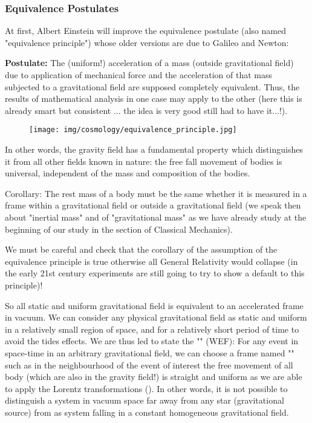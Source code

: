 	\subsubsection{Equivalence Postulates}
	At first, Albert Einstein will improve the equivalence postulate (also named "equivalence principle") whose older versions are due to Galileo and Newton:
	
	\textbf{Postulate:} The (uniform!) acceleration of a mass (outside gravitational field) due to application of mechanical force and the acceleration of that mass subjected to a gravitational field are supposed completely equivalent. Thus, the results of mathematical analysis in one case may apply to the other (here this is already smart but consistent ... the idea is very good still had to have it...!). 
	\begin{figure}[H]
		\centering
		\texttt{[image: img/cosmology/equivalence\_principle.jpg]}	
	\end{figure}
	In other words, the gravity field has a fundamental property which distinguishes it from all other fields known in nature: the free fall movement of bodies is universal, independent of the mass and composition of the bodies.
	
	Corollary: The rest mass of a body must be the same whether it is measured in a frame within a gravitational field or outside a gravitational field (we speak then about "inertial mass" and of "gravitational mass" as we have already study at the beginning of our study in the section of Classical Mechanics).
	
	\begin{tcolorbox}[title=Remark,colframe=black,arc=10pt]
	We must be careful and check that the corollary of the assumption of the equivalence principle is true otherwise all General Relativity would collapse (in the early 21st century experiments are still going to try to show a default to this principle)!
	\end{tcolorbox}	
	
	So all static and uniform gravitational field is equivalent to an accelerated frame in vacuum. We can consider any physical gravitational field as static and uniform in a relatively small region of space, and for a relatively short period of time to avoid the tides effects. We are thus led to state the "" (WEF): For any event in space-time in an arbitrary gravitational field, we can choose a frame named "" such as in the neighbourhood of the event of interest the free movement of all body (which are also in the gravity field!) is straight and uniform as we are able to apply the Lorentz transformations (). In other words, it is not possible to distinguish a system in vacuum space far away from any star (gravitational source) from as system falling in a constant homogeneous gravitational field.
	
